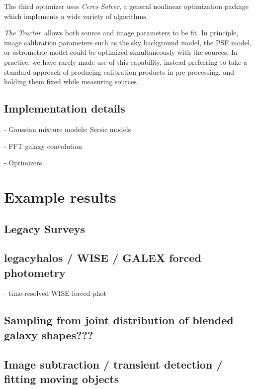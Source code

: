 \documentclass[modern, linenumbers]{aastex631}
\newcommand{\thetractor}{\emph{The Tractor}}
\begin{document}
The third optimizer uses \emph{Ceres Solver}, a general nonlinear optimization package which implements a wide variety of algorithms.

\thetractor\ allows both source and image parameters to be fit.  In principle, image calibration parameters such as the sky background model, the PSF model, or astrometric model could be optimized simultaneously with the sources.  In practice, we have rarely made use of this capability, instead preferring to take a standard approach of producing calibration products in pre-processing, and holding them fixed while measuring sources.






\subsection{Implementation details}

- Gaussian mixture models; Sersic models

- FFT galaxy convolution

- Optimizers

\section{Example results}



\subsection{Legacy Surveys}

\subsection{legacyhalos / WISE / GALEX forced photometry}

- time-resolved WISE forced phot

\subsection{Sampling from joint distribution of blended galaxy shapes???}

\subsection{Image subtraction / transient detection / fitting moving objects}
\end{document}
